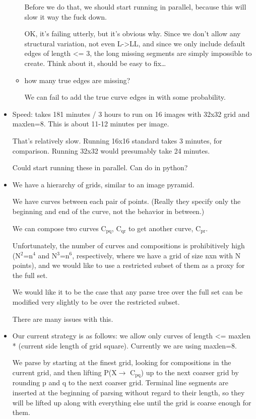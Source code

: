 \documentclass{book}
\begin{document}
\begin{itemize}
\begin{itemize}
      Before we do that, we should start running in parallel, because
      this will slow it way the fuck down.

      OK, it's failing utterly, but it's obvious why. Since we don't
      allow any structural variation, not even L->LL, and since we
      only include default edges of length <= 3, the long missing
      segments are simply impossible to create. Think about it, should
      be easy to fix\ldots{}
\item how many true edges are missing?

      We can fail to add the true curve edges in with some probability.
\end{itemize}

\item Speed: takes 181 minutes / 3 hours to run on 16 images with 32x32
    grid and maxlen=8. This is about 11-12 minutes per image.

    That's relatively slow. Running 16x16 standard takes 3 minutes,
    for comparison. Running 32x32 would presumably take 24 minutes.

    Could start running these in parallel. Can do in python?
\item We have a hierarchy of grids, similar to an image pyramid.

    We have curves between each pair of points. (Really they specify
    only the beginning and end of the curve, not the behavior in
    between.)

    We can compose two curves C$_{\mathrm{pq}}$, C$_{\mathrm{qr}}$ to get another curve, C$_{\mathrm{pr}}$.

    Unfortunately, the number of curves and compositions is
    prohibitively high (N$^2$=n$^4$ and N$^3$=n$^6$, respectively, where we
    have a grid of size nxn with N points), and we would like to use a
    restricted subset of them as a proxy for the full set.

    We would like it to be the case that any parse tree over the full
    set can be modified very slightly to be over the restricted
    subset.

    There are many issues with this.
\item Our current strategy is as follows: we allow only curves of length
    <= maxlen * (current side length of grid square). Currently we are
    using maxlen=8.

    We parse by starting at the finest grid, looking for compositions
    in the current grid, and then lifting P(X$\to$ C$_{\mathrm{pq}}$) up to the next
    coarser grid by rounding p and q to the next coarser
    grid. Terminal line segments are inserted at the beginning of
    parsing without regard to their length, so they will be lifted up
    along with everything else until the grid is coarse enough for them.


\end{itemize}
\end{document}
